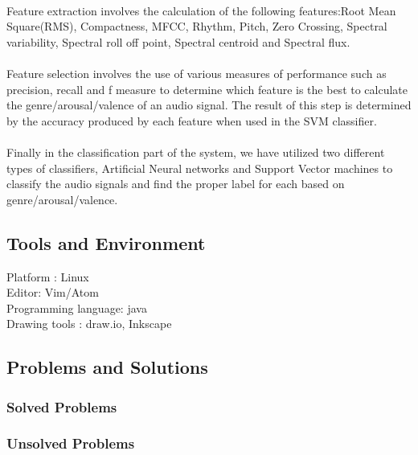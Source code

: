     \paragraph{}
    Feature extraction involves the calculation of the following features:Root Mean Square(RMS), Compactness, MFCC, Rhythm, Pitch, Zero Crossing, Spectral variability, Spectral roll off point, Spectral centroid and Spectral flux.

    \paragraph{}
    Feature selection involves the use of various measures of performance such as precision, recall and f measure to determine which feature is the best to calculate the genre/arousal/valence of an audio signal.  The result of this step is determined by the accuracy produced by each feature when used in the SVM classifier.

    \paragraph{}
    Finally in the classification part of the system, we have utilized two different types of classifiers, Artificial Neural networks and Support Vector machines to classify the audio signals and find the proper label for each based on genre/arousal/valence.
\subsection{Tools and Environment}
    Platform : Linux\\
	Editor: Vim/Atom\\
	Programming language: java\\
	Drawing tools : draw.io, Inkscape
\subsection{Problems and Solutions}
\subsubsection{Solved Problems}
\subsubsection{Unsolved Problems}
